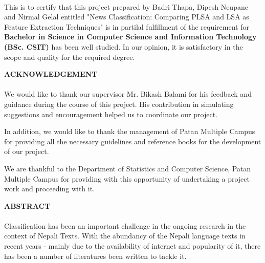 \documentclass[12pt]{report}
\begin{document}
\paragraph{}
This is to certify that this project prepared by Badri Thapa, Dipesh Neupane and Nirmal Gelal entitled "News Classification: Comparing PLSA and LSA as Feature Extraction Techniques"
        is in partilal fulfillment of the requirement for \textbf{Bachelor in Science in Computer Science and Information Technology (BSc. CSIT)} has been well studied. In our opinion, it is satisfactory in the scope and quality for the required degree.
        



    \newpage

    \begin{center}
        \textbf{ACKNOWLEDGEMENT}


    \end{center}
    \paragraph{}
        We would like to thank our supervisor Mr. Bikash Balami for his feedback and guidance during the course of this project.
        His contribution in simulating suggestions and encouragement helped us to coordinate our project.

        In addition, we would like to thank the management of Patan Multiple Campus for providing all the necessary guidelines and reference books for the development of 
        our project. 

        We are thankful to the Department of Statistics and Computer Science, Patan Multiple Campus for providing with this opportunity of undertaking a project work and 
        proceeding with it.

    





    \newpage

 \begin{center}
        \textbf{ABSTRACT}
        

    \end{center}
    \paragraph{}
        Classification has been an important challenge in the ongoing research in the context of Nepali Texts.
        With the abundancy of the Nepali language texts in recent years - mainly due to the availability of internet and 
        popularity of it, there has been a number of literatures been written to tackle it. 
\end{document}
